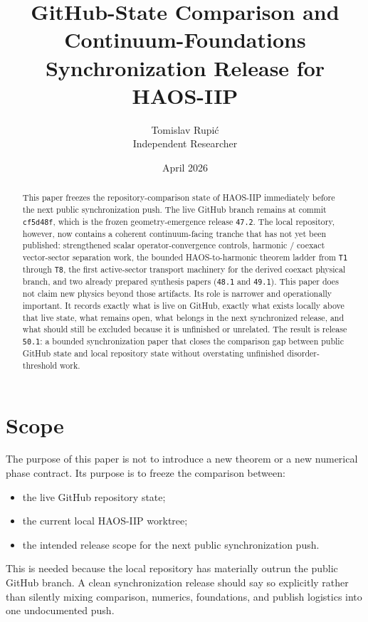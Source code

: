 \documentclass[11pt]{article}
\title{GitHub-State Comparison and Continuum-Foundations Synchronization Release for HAOS-IIP}
\author{Tomislav Rupi\'c \\ Independent Researcher}
\date{April 2026}
\begin{document}
\maketitle

\begin{abstract}
This paper freezes the repository-comparison state of HAOS-IIP immediately before the next public synchronization push. The live GitHub branch remains at commit \texttt{cf5d48f}, which is the frozen geometry-emergence release \texttt{47.2}. The local repository, however, now contains a coherent continuum-facing tranche that has not yet been published: strengthened scalar operator-convergence controls, harmonic / coexact vector-sector separation work, the bounded HAOS-to-harmonic theorem ladder from \texttt{T1} through \texttt{T8}, the first active-sector transport machinery for the derived coexact physical branch, and two already prepared synthesis papers (\texttt{48.1} and \texttt{49.1}). This paper does not claim new physics beyond those artifacts. Its role is narrower and operationally important. It records exactly what is live on GitHub, exactly what exists locally above that live state, what remains open, what belongs in the next synchronized release, and what should still be excluded because it is unfinished or unrelated. The result is release \texttt{50.1}: a bounded synchronization paper that closes the comparison gap between public GitHub state and local repository state without overstating unfinished disorder-threshold work.
\end{abstract}

\tableofcontents

\section{Scope}

The purpose of this paper is not to introduce a new theorem or a new numerical phase contract. Its purpose is to freeze the comparison between:
\begin{itemize}
\item the live GitHub repository state;
\item the current local HAOS-IIP worktree;
\item the intended release scope for the next public synchronization push.
\end{itemize}

This is needed because the local repository has materially outrun the public GitHub branch. A clean synchronization release should say so explicitly rather than silently mixing comparison, numerics, foundations, and publish logistics into one undocumented push.
\end{document}
